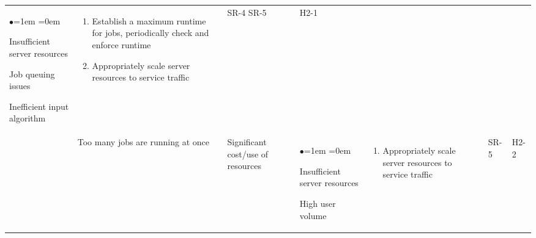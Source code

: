 \documentclass{article}
\begin{document}
\begin{table}[H]
\begin{tabularx}{\textwidth}{|P{2cm}|P{2cm}|P{2cm}|P{2cm}|P{3.45cm}|P{1cm}|P{1cm}|}
\begin{list}{$\bullet$}{\leftmargin=1em \itemindent=0em}
            \item Insufficient server resources
            \item Job queuing issues
            \item Inefficient input algorithm
        \end{list}
        & 
        \begin{enumerate}[label=(\alph*)]{\leftmargin=1em \itemindent=0em}
            \item Establish a maximum runtime for jobs, periodically check and enforce runtime
            \item Appropriately scale server resources to service traffic
        \end{enumerate}
        & SR-4 SR-5 & H2-1\\
        & Too many jobs are running at once & Significant cost/use of resources & 
        \begin{list}{$\bullet$}{\leftmargin=1em \itemindent=0em}
            \item Insufficient server resources
            \item High user volume
        \end{list}
        & 
        \begin{enumerate}[label=(\alph*)]{\leftmargin=1em \itemindent=0em}
            \item Appropriately scale server resources to service traffic
        \end{enumerate}
        & SR-5 & H2-2\\
        \hline
    \end{tabularx}
\end{table}
\end{document}
